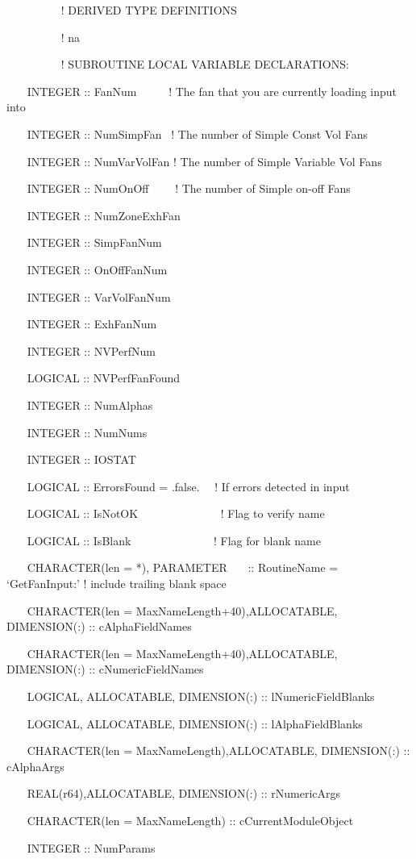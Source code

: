 ~~~~~~~~~ ! DERIVED TYPE DEFINITIONS

~~~~~~~~~ ! na

~~~~~~~~~ ! SUBROUTINE LOCAL VARIABLE DECLARATIONS:

~~~ INTEGER :: FanNum~~~~~ ! The fan that you are currently loading input into

~~~ INTEGER :: NumSimpFan~ ! The number of Simple Const Vol Fans

~~~ INTEGER :: NumVarVolFan ! The number of Simple Variable Vol Fans

~~~ INTEGER :: NumOnOff~~~~ ! The number of Simple on-off Fans

~~~ INTEGER :: NumZoneExhFan

~~~ INTEGER :: SimpFanNum

~~~ INTEGER :: OnOffFanNum

~~~ INTEGER :: VarVolFanNum

~~~ INTEGER :: ExhFanNum

~~~ INTEGER :: NVPerfNum

~~~ LOGICAL :: NVPerfFanFound

~~~ INTEGER :: NumAlphas

~~~ INTEGER :: NumNums

~~~ INTEGER :: IOSTAT

~~~ LOGICAL :: ErrorsFound = .false.~~ ! If errors detected in input

~~~ LOGICAL :: IsNotOK~~~~~~~~~~~~~~ ! Flag to verify name

~~~ LOGICAL :: IsBlank~~~~~~~~~~~~~~ ! Flag for blank name

~~~ CHARACTER(len = *), PARAMETER~~~ :: RoutineName = `GetFanInput:' ! include trailing blank space

~~~ CHARACTER(len = MaxNameLength+40),ALLOCATABLE, DIMENSION(:) :: cAlphaFieldNames

~~~ CHARACTER(len = MaxNameLength+40),ALLOCATABLE, DIMENSION(:) :: cNumericFieldNames

~~~ LOGICAL, ALLOCATABLE, DIMENSION(:) :: lNumericFieldBlanks

~~~ LOGICAL, ALLOCATABLE, DIMENSION(:) :: lAlphaFieldBlanks

~~~ CHARACTER(len = MaxNameLength),ALLOCATABLE, DIMENSION(:) :: cAlphaArgs

~~~ REAL(r64),ALLOCATABLE, DIMENSION(:) :: rNumericArgs

~~~ CHARACTER(len = MaxNameLength) :: cCurrentModuleObject

~~~ INTEGER :: NumParams

